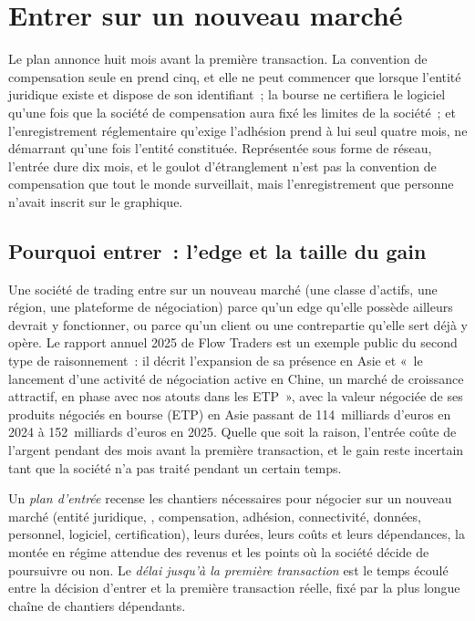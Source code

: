 \chapter{Entrer sur un nouveau marché}\label{ch:fm:entering-a-new-market}

Le plan annonce huit mois avant la première transaction. La convention de compensation seule en prend cinq, et elle ne peut commencer que lorsque l'entité juridique existe et
dispose de son identifiant~; la bourse ne certifiera le logiciel qu'une fois que la société de compensation aura fixé les limites de la société~; et l'enregistrement réglementaire
qu'exige l'adhésion prend à lui seul quatre mois, ne démarrant qu'une fois l'entité constituée. Représentée sous forme de réseau, l'entrée dure dix mois, et le
goulot d'étranglement n'est pas la convention de compensation que tout le monde surveillait, mais l'enregistrement que personne n'avait inscrit sur le graphique.

\section{Pourquoi entrer~: l'edge et la taille du gain}

Une société de trading entre sur un nouveau marché (une classe d'actifs, une région, une plateforme de négociation) parce qu'un edge qu'elle possède ailleurs devrait y fonctionner, ou parce qu'un client ou
une contrepartie qu'elle sert déjà y opère. Le rapport annuel 2025 de Flow Traders est un exemple public du second type de raisonnement~: il décrit
l'expansion de sa présence en Asie et «~le lancement d'une activité de négociation active en Chine, un marché de croissance attractif, en phase avec nos atouts dans les ETP~», avec
la valeur négociée de ses produits négociés en bourse (ETP) en Asie passant de 114~milliards d'euros en 2024 à 152~milliards d'euros en 2025. Quelle que soit la raison, l'entrée coûte
de l'argent pendant des mois avant la première transaction, et le gain reste incertain tant que la société n'a pas traité pendant un certain temps.

\begin{definition}\label{def:fm:entering-a-new-market:plan}
Un \emph{plan d'entrée} recense les chantiers nécessaires pour négocier sur un nouveau marché (entité juridique, , compensation,
adhésion, connectivité, données, personnel, logiciel, certification), leurs durées, leurs coûts et leurs dépendances, la montée en régime attendue des revenus et les
points où la société décide de poursuivre ou non. Le \emph{délai jusqu'à la première transaction} est le temps écoulé entre la décision
d'entrer et la première transaction réelle, fixé par la plus longue chaîne de chantiers dépendants.
\end{definition}

